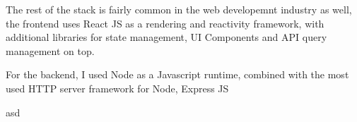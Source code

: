 The rest of the stack is fairly common in the web developemnt industry as well, the frontend uses React JS as a rendering and reactivity framework,
with additional libraries for state management, UI Components and API query management on top.

For the backend, I used Node as a Javascript runtime, combined with the most used HTTP server framework for Node, Express JS \cite{Github:VanoDevium/node-framework-stars}

asd